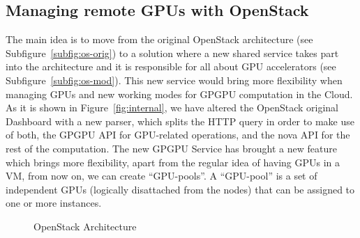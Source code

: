 \documentclass[a4paper,twoside]{article}
\begin{document}
\subsection{Managing remote GPUs with OpenStack}
The main idea is to move from the original OpenStack architecture (see Subfigure~\ref{subfig:os-orig})
 to a solution where a new shared service takes part into the architecture and it 
is responsible for all about GPU accelerators (see Subfigure~\ref{subfig:os-mod}).
This new service would bring more flexibility when managing GPUs and new working modes for GPGPU computation in the Cloud.
As it is shown in Figure~\ref{fig:internal}, we have altered the OpenStack original Dashboard with a new parser, 
which splits the HTTP query in order to make use of both, the GPGPU API for GPU-related operations, and the nova API for the rest of the computation. 
The new GPGPU Service has brought a new feature which brings more flexibility, apart from the regular idea of having GPUs in a VM, from now on, we can create ``GPU-pools''. 
A ``GPU-pool'' is a set of independent GPUs (logically disattached from the nodes) that can be assigned to one or more instances.

\begin{figure}[htb]
  \centering
   \quad
  \caption{OpenStack Architecture}
  \label{fig:os}
\end{figure}
\end{document}
